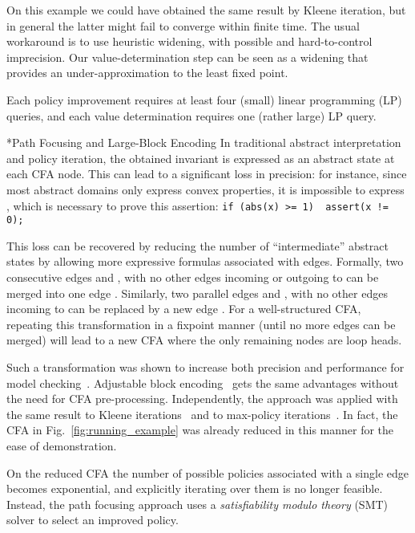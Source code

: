 \documentclass{llncs}
\makeatletter
\newcommand{\cfa}{\textsc{CFA}\xspace}
\renewcommand{\paragraph}{\@startsection{paragraph}{4}{\z@}{0.8ex \@plus 0ex \@minus 1ex}{-1em}{\normalfont\normalsize\bfseries}}
\makeatother
\begin{document}
\begin{example}
 On this example we could have obtained the
 same result by Kleene iteration,
 but in general the latter might fail to converge within finite time.
 The usual workaround is to use heuristic widening,
 with possible and hard-to-control imprecision.
Our value-determination step can be seen as a widening that provides an under-approximation to the least fixed point.

    Each policy improvement requires at least four (small) linear programming
    (LP) queries, and each value determination requires one (rather large)
    LP query.
    \label{ex:running-example-trace}
\end{example}

\paragraph*{Path Focusing and Large-Block Encoding}
In traditional abstract interpretation and policy iteration, the obtained
invariant is expressed as an abstract state at each \cfa node.
This can lead to a significant loss in precision: for instance, since most
abstract domains only express convex properties, it is impossible to express
, which is necessary to prove this assertion:
\texttt{if (abs(x) >= 1) { assert(x != 0); }}

This loss can be recovered by reducing the number of ``intermediate''
abstract states by allowing more expressive formulas associated with edges.
Formally, two consecutive edges  and , with no other edges incoming or outgoing to  can be merged into one edge
 .
Similarly, two parallel edges  and , with no other edges incoming to  can be replaced by a new edge
.
For a well-structured \cfa, repeating this transformation in a fixpoint manner
(until no more edges can be merged) will lead to a new \cfa where the only
remaining nodes are loop heads.

Such a transformation was shown to increase both precision and performance for
model checking~\cite{large_block_encoding}.
Adjustable block encoding~\cite{adjustable_block_encoding} gets the same
advantages without the need for \cfa pre-processing.
Independently, the approach was applied with the same result to Kleene
iterations~\cite{path_focusing} and to max-policy
iterations~\cite{policy_iteration_path_focusing}.
In fact, the \cfa in Fig.~\ref{fig:running_example} was already
reduced in this manner for the ease of demonstration.

On the reduced \cfa the number of possible policies associated with a single
edge becomes exponential,
and explicitly iterating over them is no longer feasible.
Instead, the path focusing approach uses a \emph{satisfiability modulo theory}
(SMT) solver to select an improved policy.
\end{document}
